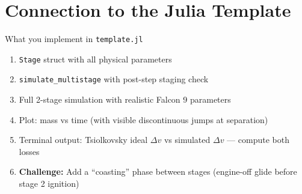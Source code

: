 \documentclass[12pt, a4paper]{article}
\begin{document}
\section{Connection to the Julia Template}

\begin{theorybox}{What you implement in \texttt{template.jl}}
\begin{enumerate}
  \item \texttt{Stage} struct with all physical parameters
  \item \texttt{simulate\_multistage} with post-step staging check
  \item Full 2-stage simulation with realistic Falcon 9 parameters
  \item Plot: mass vs time (with visible discontinuous jumps at separation)
  \item Terminal output: Tsiolkovsky ideal $\Delta v$ vs simulated $\Delta v$ — compute both losses
  \item \textbf{Challenge:} Add a ``coasting'' phase between stages (engine-off glide before stage 2 ignition)
\end{enumerate}
\end{theorybox}
\end{document}
